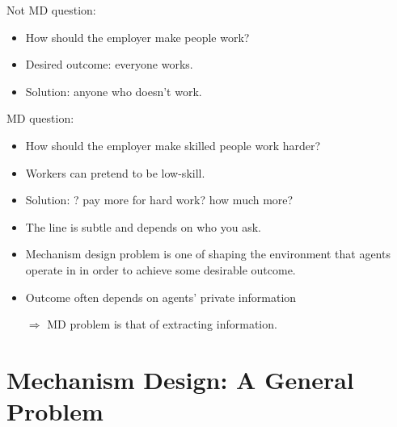 \documentclass[english,handout]{beamer}		%
\def\lyxframeend{} %
\begin{document}
\begin{exampleblock}{Not MD question:}
	\begin{itemize}
		\item How should the employer \alert<1>{make people work}?
		\item Desired outcome: everyone works.
		\item Solution:  anyone who doesn't work.
	\end{itemize}
\end{exampleblock}
\pause
\begin{exampleblock}{MD question:}
	\begin{itemize}
		\item How should the employer \alert<2>{make skilled people work harder}?
		\item Workers can pretend to be low-skill.
		\item Solution: ? pay more for hard work? how much more?
	\end{itemize}
\end{exampleblock}
\pause
\begin{itemize}
\item The line is subtle and depends on who you ask.
\end{itemize}
\lyxframeend


\begin{itemize}
	\item Mechanism design problem is one of shaping the environment that agents operate in in order to achieve some desirable outcome.
	\item Outcome often depends on agents' private information 
	
	$\Rightarrow$ MD problem is that of extracting information.
\end{itemize}
\lyxframeend




\section{Mechanism Design: A General Problem}
\end{document}
